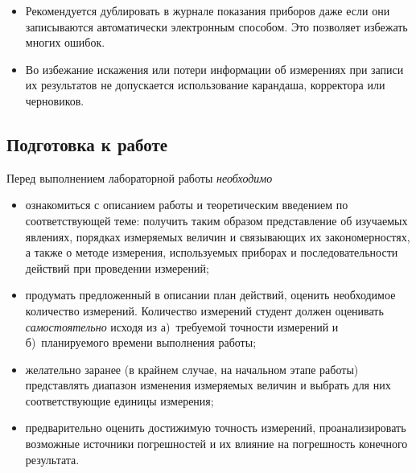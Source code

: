 \begin{itemize}
    \item Рекомендуется дублировать в журнале показания приборов даже если они
записываются автоматически электронным способом. Это позволяет избежать многих
ошибок.

    \item Во избежание искажения или потери информации об измерениях
    при записи их результатов не допускается использование карандаша, корректора или черновиков.
\end{itemize}

\subsection{Подготовка к работе}

Перед выполнением лабораторной работы \emph{необходимо}
\begin{itemize}
    \small
    \item ознакомиться с описанием работы и теоретическим введением по
соответствующей теме: получить таким образом представление об
изучаемых явлениях, порядках измеряемых величин и связывающих их закономерностях,
а также о методе измерения, используемых приборах и последовательности
действий при проведении измерений;


    \item продумать предложенный в описании план действий, оценить необходимое
    количество измерений. Количество измерений студент должен оценивать
    \emph{самостоятельно} исходя из а)~требуемой точности измерений и б)~планируемого времени выполнения работы;

    \item желательно заранее (в крайнем случае, на начальном этапе работы)
    представлять диапазон изменения измеряемых величин и выбрать для них
    соответствующие единицы измерения;

    \item предварительно оценить достижимую точность
    измерений, проанализировать возможные источники погрешностей и их
    влияние на погрешность конечного результата.
\end{itemize}

